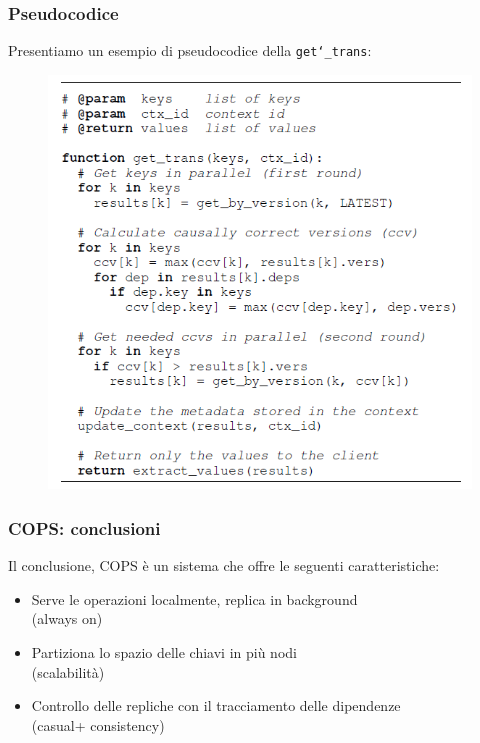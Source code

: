 \begin{frame}
\frametitle{Pseudocodice}
Presentiamo un esempio di pseudocodice della \texttt{get\char`_trans}:
\begin{figure}
	\centering
	\includegraphics[scale=0.40]{COPS/COPS5.png}
\end{figure}
\end{frame}

\begin{frame}
\frametitle{COPS: conclusioni}
Il conclusione, COPS è un sistema che offre le seguenti caratteristiche:
\begin{itemize}
	\item<1-> Serve le operazioni localmente, replica in background \\
			  (always on)
	\item<1-> Partiziona lo spazio delle chiavi in più nodi \\
			  (scalabilità)
	\item<1-> Controllo delle repliche con il tracciamento delle dipendenze \\
			  (casual+ consistency)
\end{itemize}
\end{frame}
